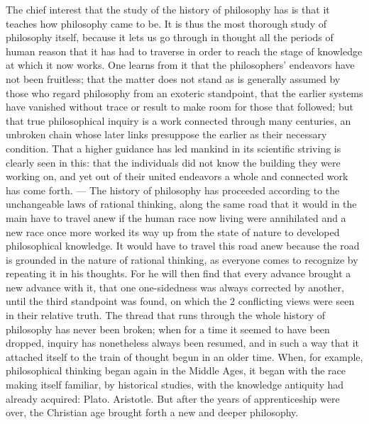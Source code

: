 \documentclass[12pt]{article}
\newcommand{\opage}[1]{\marginnote{\footnotesize\textit{[#1]}}}
\begin{document}
The chief interest that the study of the history of philosophy has is that it teaches how philosophy came to be. It is thus the most thorough study of philosophy itself, because it lets us go through in thought all the periods of human reason that it has had to traverse in order to reach the stage of knowledge at which it now works. One learns from it that the philosophers' endeavors have not been fruitless; that the matter does not stand as is generally assumed by those who regard philosophy from an exoteric standpoint, that the earlier systems have vanished without trace or result to make room for those that followed; but that true philosophical inquiry is a work connected through many centuries, an unbroken chain\opage{6r} whose later links presuppose the earlier as their necessary condition. That a higher guidance has led mankind in its scientific striving is clearly seen in this: that the individuals did not know the building they were working on, and yet out of their united endeavors a whole and connected work has come forth. --- The history of philosophy has proceeded according to the unchangeable laws of rational thinking, along the same road that it would in the main have to travel anew if the human race now living were annihilated and a new race once more worked its way up from the state of nature to developed philosophical knowledge. It would have to travel this road anew because the road is grounded in the nature of rational thinking, as everyone comes to recognize by repeating it in his thoughts. For he will then find that every advance brought a new advance with it, that one one-sidedness was always corrected by another, until the third standpoint was found, on which the 2 conflicting views were seen in their relative truth. The thread that runs through the whole history of philosophy has never been broken; when for a time it seemed to have been dropped, inquiry has nonetheless always been resumed, and in such a way that it attached itself to the train of thought begun in an older time. When, for example, philosophical thinking began again in the Middle Ages,\opage{6v} it began with the race making itself familiar, by historical studies, with the knowledge antiquity had already acquired: Plato. Aristotle. But after the years of apprenticeship were over, the Christian age brought forth a new and deeper philosophy.
\end{document}
